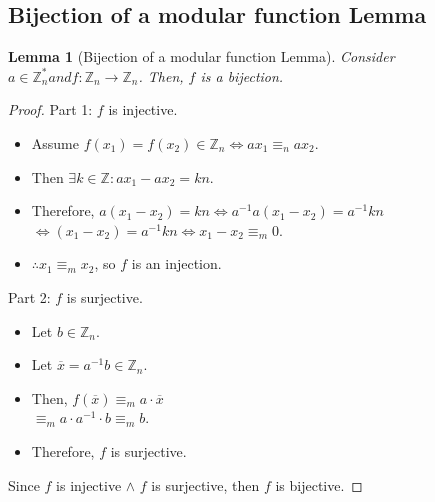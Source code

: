\documentclass[12pt, a4paper, english]{report}
\newtheorem{lemma}{Lemma}
\begin{document}
\subsection{Bijection of a modular function Lemma}
\begin{lemma}[Bijection of a modular function Lemma]\label{bijection_lemma}
    Consider $a \in \mathbb{Z}_{n}^{*} and f: \mathbb{Z}_{n} \rightarrow \mathbb{Z}_{n}$.\newline
    Then, $f$ is a bijection.\newline
\end{lemma}
\begin{proof}
    Part 1: $f$ is injective.\newline
    \begin{itemize}
        \item Assume $f(x_{1}) = f(x_{2}) \in \mathbb{Z}_{n} \iff ax_{1} \equiv_{n} ax_{2}$.
        \item Then $\exists k \in \mathbb{Z}: ax_{1} - ax_{2} = kn$.
        \item Therefore, $a(x_{1} - x_{2}) = kn \iff a^{-1}a(x_{1} - x_{2}) = a^{-1}kn$\\
        $\iff (x_{1} - x_{2}) = a^{-1}kn \iff x_{1} - x_{2} \equiv_{m} 0$.
        \item $\therefore x_{1} \equiv_{m} x_{2}$, so $f$ is an injection.
    \end{itemize}
    Part 2: $f$ is surjective.
    \begin{itemize}
        \item Let $b \in \mathbb{Z}_{n}$.
        \item Let $\overline{x} = a^{-1}b \in \mathbb{Z}_{n}$.
        \item Then, $f(\overline{x}) \equiv_{m} a \cdot \overline{x}$\\
        $\equiv_{m} a \cdot a^{-1} \cdot b \equiv_{m} b$.
        \item Therefore, $f$ is surjective.
    \end{itemize}
    Since $f$ is injective $\land$ $f$ is surjective, then $f$ is bijective.
\end{proof}
\end{document}
